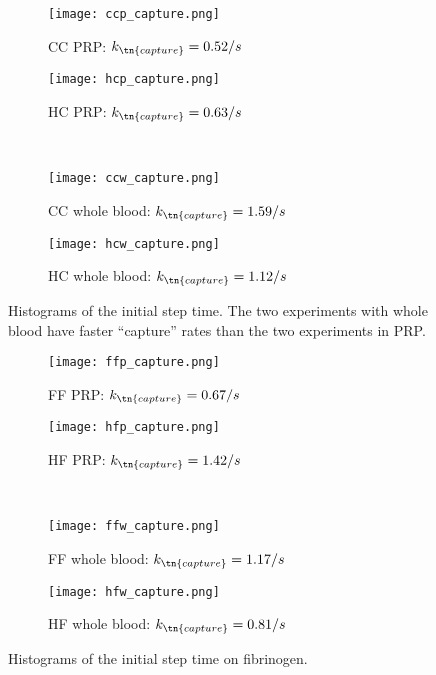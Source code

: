 \begin{figure}
  \centering
  \begin{subfigure}{0.48\textwidth}
    \texttt{[image: ccp\_capture.png]}
    \caption{CC PRP: $k_\tn{capture} = 0.52 / s$}
  \end{subfigure}
  \hfill
  \begin{subfigure}{0.48\textwidth}
    \texttt{[image: hcp\_capture.png]}
    \caption{HC PRP: $k_\tn{capture} = 0.63 / s$}
  \end{subfigure}
  \\
  \begin{subfigure}{0.48\textwidth}
    \texttt{[image: ccw\_capture.png]}
    \caption{CC whole blood: $k_\tn{capture} = 1.59 / s$}
  \end{subfigure}
  \hfill
  \begin{subfigure}{0.48\textwidth}
    \texttt{[image: hcw\_capture.png]}
    \caption{HC whole blood: $k_\tn{capture} = 1.12 / s$}
  \end{subfigure}
  \caption{Histograms of the initial step time. The two experiments
    with whole blood have faster ``capture'' rates than the two
    experiments in PRP.}
  \label{fig:col-capture}
\end{figure}

\begin{figure}
  \centering
  \begin{subfigure}{0.48\textwidth}
    \texttt{[image: ffp\_capture.png]}
    \caption{FF PRP: $k_\tn{capture} = 0.67 / s$}
  \end{subfigure}
  \hfill
  \begin{subfigure}{0.48\textwidth}
    \texttt{[image: hfp\_capture.png]}
    \caption{HF PRP: $k_\tn{capture} = 1.42 / s$}
  \end{subfigure}
  \\
  \begin{subfigure}{0.48\textwidth}
    \texttt{[image: ffw\_capture.png]}
    \caption{FF whole blood: $k_\tn{capture} = 1.17 / s$}
  \end{subfigure}
  \hfill
  \begin{subfigure}{0.48\textwidth}
    \texttt{[image: hfw\_capture.png]}
    \caption{HF whole blood: $k_\tn{capture} = 0.81 / s$}
  \end{subfigure}
  \caption{Histograms of the initial step time on fibrinogen.}
  \label{fig:fbg-capture}
\end{figure}

